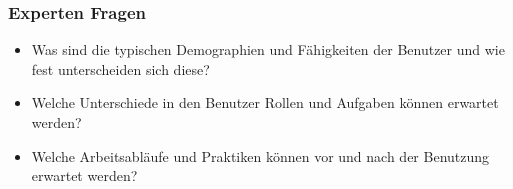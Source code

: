 \subsubsection{Experten Fragen}
\begin{itemize}
  \item Was sind die typischen Demographien und Fähigkeiten der Benutzer und wie fest unterscheiden sich diese?
  \item Welche Unterschiede in den Benutzer Rollen und Aufgaben können erwartet werden?
  \item Welche Arbeitsabläufe und Praktiken können vor und nach der Benutzung erwartet  werden?
\end{itemize}